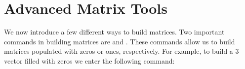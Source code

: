 	
\section*{Advanced Matrix Tools}

We now introduce a few different ways to build matrices. Two important commands in building matrices are  and . These commands allow us to build matrices populated with zeros or ones, respectively. For example, to build a 3-vector filled with zeros we enter the following command:

